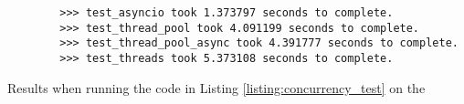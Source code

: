 






\begin{listing}
    \begin{verbatim}
        >>> test_asyncio took 1.373797 seconds to complete.
        >>> test_thread_pool took 4.091199 seconds to complete.
        >>> test_thread_pool_async took 4.391777 seconds to complete.
        >>> test_threads took 5.373108 seconds to complete.
    \end{verbatim}
    \caption{Results when running the code in Listing  \ref{listing:concurrency_test} on the \jx}
\end{listing}

